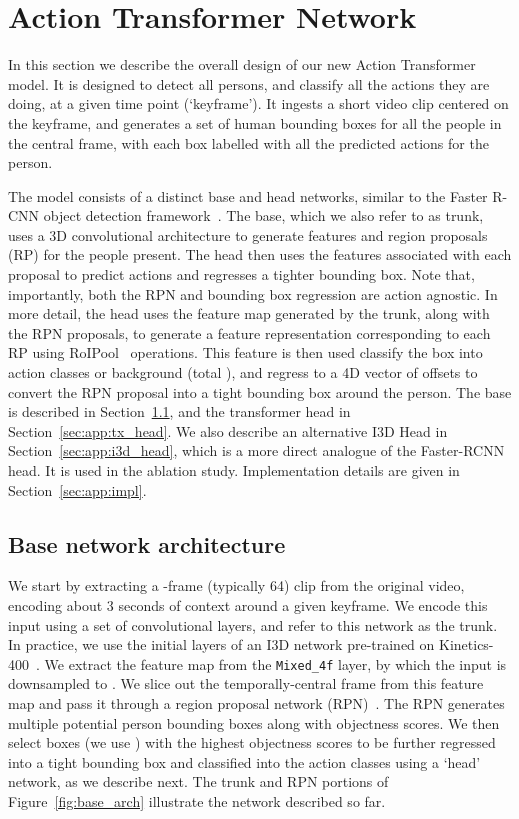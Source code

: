 \documentclass[10pt,twocolumn,letterpaper]{article}
\newcommand{\Tx}[0]{Action Transformer}
\begin{document}
\section{\Tx{}  Network}\label{sec:app}


In this section we describe the overall design of our new \Tx{} model.
It is designed  to detect all persons, and
classify all the actions they are doing, at a given time point
(`keyframe').  It ingests a short video clip 
centered on the keyframe, and generates
a set of human bounding boxes for all the people in the central frame,
with each box labelled with all the
predicted actions for the person.

The model  consists of a distinct base and head networks, similar to the
Faster R-CNN object
detection framework~\cite{ren2015faster}.  The base, which we also refer to as trunk, uses a 
3D convolutional
architecture to generate features and region
proposals (RP) for the people present. The head then uses the features associated with each proposal to
predict actions and regresses a tighter bounding box. Note that, importantly, both the RPN and bounding box
regression 
are action agnostic. 
In more detail, the head 
uses the feature map generated by the
trunk, along with the RPN proposals, to generate a feature
representation corresponding to each RP using RoIPool~\cite{huang2017speed} operations.
This feature is then used classify the box into  action classes or background (total ),
and regress to a 4D vector of offsets to convert the RPN proposal into
a tight bounding box around the person.  The base  is described in
Section~\ref{sec:app:base_arch}, and the transformer head in
Section~\ref{sec:app:tx_head}. We also describe an alternative
I3D Head in
Section~\ref{sec:app:i3d_head}, which is a more direct analogue of the
Faster-RCNN head. It is used in the ablation study.  Implementation
details are given in Section~\ref{sec:app:impl}.

\subsection{Base network architecture}\label{sec:app:base_arch}

We start by
extracting a -frame (typically 64) clip from the original video,
encoding about 3 seconds of context around a given keyframe. We encode
this input using a set of convolutional layers, and refer to this
network as the trunk. In practice, we use the initial layers of an I3D
network pre-trained on Kinetics-400~\cite{carreira2017quo}. We extract
the feature map from the {\tt Mixed\_4f} layer, by which the  input is downsampled to . We slice out the temporally-central 
frame from this feature map and pass it through a region
proposal network (RPN)~\cite{ren2015faster}.  The RPN generates
multiple potential person bounding boxes along with objectness
scores. We then select  boxes (we use ) with the highest objectness scores to be
further regressed into a tight bounding box and classified into the
action classes using a `head' network, as we describe next.  The trunk
and RPN portions of Figure~\ref{fig:base_arch} illustrate the network
described so far.
\end{document}
